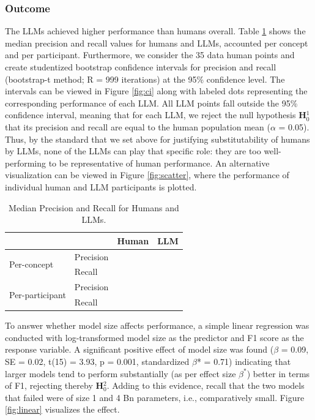 \subsubsection{Outcome}

The LLMs achieved higher performance than humans overall. Table \ref{tab:medians} shows the median precision and recall values for humans and LLMs, accounted per concept and per participant. Furthermore, we consider the 35 data human points and create studentized bootstrap confidence intervals for precision and recall (bootstrap-t method; R = 999 iterations) at the 95\% confidence level. The intervals can be viewed in Figure \ref{fig:ci} along with labeled dots representing the corresponding performance of each LLM. All LLM points fall outside the 95\% confidence interval, meaning that for each LLM, we reject the null hypothesis \textbf{H$_0^1$} that its precision and recall are equal to the human population mean ($\alpha$ = 0.05). Thus, by the standard that we set above for justifying  substitutability of humans by LLMs, none of the LLMs can play that specific role: they are too well-performing to be representative of human performance. An alternative visualization can be viewed in Figure \ref{fig:scatter}, where the performance of individual human and LLM participants is plotted. 



\begin{table}[ht]
  \centering
  \caption{Median Precision and Recall for Humans and LLMs.}
  \label{tab:medians}
  \begin{tabular}{llrr}
    \toprule
    & & Human & LLM \\
    \midrule
    \multirow{2}{*}{Per-concept}     & Precision &  &  \\
                                     & Recall    &  &  \\
    \midrule
    \multirow{2}{*}{Per-participant} & Precision &  &  \\
                                     & Recall    &  &  \\
    \bottomrule
  \end{tabular}
\end{table}

To answer whether model size affects performance, a simple linear regression was conducted with log-transformed model size as the predictor and F1 score as the response variable. A significant positive effect of model size was found
($\beta$ = 0.09, SE = 0.02, t(15) = 3.93, p = 0.001, standardized $\beta$* = 0.71)
indicating that larger models tend to perform substantially (as per effect size $\beta^*$) better in terms of F1, rejecting thereby \textbf{H$_0^2$}. Adding to this evidence, recall that the two models that failed were of size 1 and 4 Bn parameters, i.e., comparatively small. Figure \ref{fig:linear} visualizes the effect.

